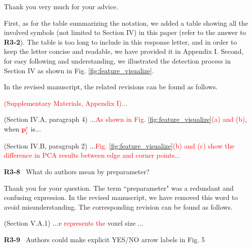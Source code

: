 \documentclass[journal]{IEEEtran}
\newcommand{\rev}[1]{\textcolor{red}{#1}}
\begin{document}
Thank you very much for your advice. 

First, as for the table summarizing the notation, we added a table showing all the involved symbols (not limited to Section IV) in this paper (refer to the answer to \textbf{R3-2}). The table is too long to include in this response letter, and in order to keep the letter concise and readable, we have provided it in Appendix I. 
Second, for easy following and understanding, we illustrated the detection process in Section IV as shown in Fig. \ref{fig:feature_visualize}. 

In the revised manuscript, the related revisions can be found as follows. 

\rev{(Supplementary Materials, Appendix I)...}

(Section IV.A, paragraph 4)
...\rev{As shown in Fig. \ref{fig:feature_visualize}(a) and (b)}, when \rev{$\mathbf{p}_i^\text{c}$} is...

(Section IV.B, paragraph 2)
...\rev{Fig. \ref{fig:feature_visualize}(b) and (c) show the difference in PCA results between edge and corner points...}



\bigskip

\noindent
{\textbf{\color{black}R3-8}\color{gray}~
What do authors mean by preparameter?
}

Thank you for your question. The term ``preparameter" was a redundant and confusing expression. In the revised manuscript, we have removed this word to avoid misunderstanding. The corresponding revision can be found as follows.

(Section V.A.1)
...$v$ \rev{represents the} voxel size ...
\bigskip

\noindent
{\textbf{\color{black}R3-9}\color{gray}~
Authors could make explicit YES/NO arrow labels in Fig. 5
}
\end{document}
